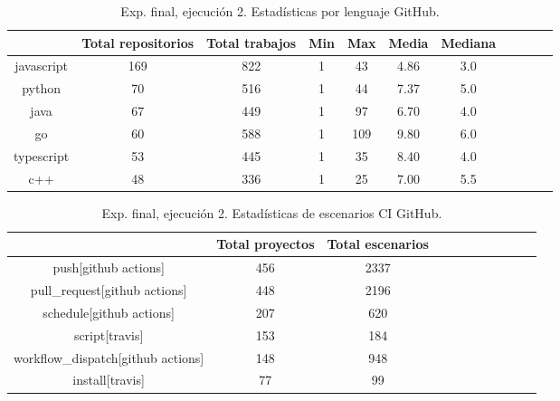 \begin{table}
  \centering
  \caption{Exp. final, ejecución 2. Estadísticas por lenguaje GitHub.}
  \label{tab:tabla_f2_4}

\begin{footnotesize}
\renewcommand{\arraystretch}{1.5} %
\begin{tabular}{ccccccccccc}
  \hline
  {} &  Total repositorios &  Total trabajos &  Min &  Max &  Media &  Mediana \\
  \hline
  javascript    &        169 &         822 &    1 &   43 &    4.86 &      3.0 \\
  python        &         70 &         516 &    1 &   44 &    7.37 &      5.0 \\
  java          &         67 &         449 &    1 &   97 &    6.70 &      4.0 \\
  go            &         60 &         588 &    1 &  109 &    9.80 &      6.0 \\
  typescript    &         53 &         445 &    1 &   35 &    8.40 &      4.0 \\
  c++           &         48 &         336 &    1 &   25 &    7.00 &      5.5 \\
 \end{tabular}
\end{footnotesize}

\end{table}

\begin{table}
  \centering
  \caption{Exp. final, ejecución 2. Estadísticas de escenarios CI GitHub.}
  \label{tab:tabla_f2_5}

\begin{footnotesize}
\renewcommand{\arraystretch}{1.5} %
\begin{tabular}{ccccccccccc}
  \hline
  {} &  Total proyectos &  Total escenarios \\
  \hline
  push[github actions]                        &                 456 &          2337 \\
  pull\_request[github actions]                &                 448 &          2196 \\
  schedule[github actions]                    &                 207 &           620 \\
  script[travis]                              &                 153 &           184 \\
  workflow\_dispatch[github actions]           &                 148 &           948 \\
  install[travis]                             &                  77 &            99 \\
 \end{tabular}
\end{footnotesize}

\end{table}

